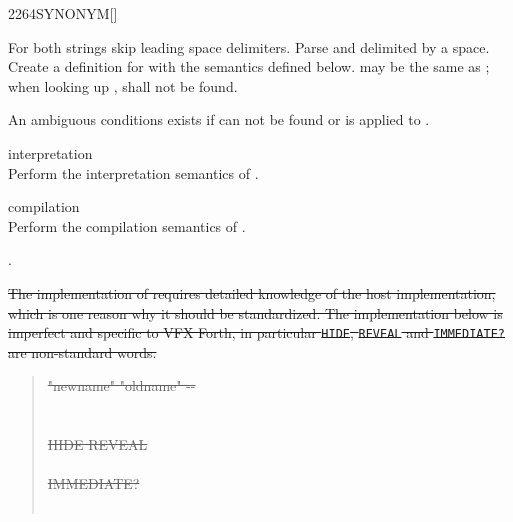 \begin{worddef}{2264}{SYNONYM}[]%
\item {}

	For both strings skip leading space delimiters.  Parse 
	and  delimited by a space.  Create a definition for
	 with the semantics defined below.
	 may be the same as ;
	when looking up ,  shall not be found.

	An ambiguous conditions exists if  can not be found or
	 is applied to .

\item[\param{newname} interpretation]
	 \\
	Perform the interpretation semantics of .

\item[\param{newname} compilation]
	 \\
	Perform the compilation semantics of .

\see {}.

	\begin{implement} %
		\cbstart{}%
		\dffamily
		\sout{The implementation of  requires detailed knowledge
		of the host implementation, which is one reason why it should be
		standardized.  The implementation below is imperfect and specific
		to VFX Forth, in particular \texttt{HIDE}, \texttt{REVEAL} and
		\texttt{IMMEDIATE?} are non-standard words.}

		\begin{quote}\ttfamily
			\sout{\word{:}   "newname" "oldname" -{-}} \\
			\sout{ } \\
			\tab \sout{ } \\
			\tab[2] \sout{HIDE  \word{,} REVEAL} \\
			\tab \sout{} \\
			\tab[2] \sout{      IMMEDIATE? } \\
			\tab[2] \sout{    } \\
			\sout{\word{;}}
		\end{quote}
		\cbend
		\vspace*{-1ex}
	\end{implement}
\end{worddef}

